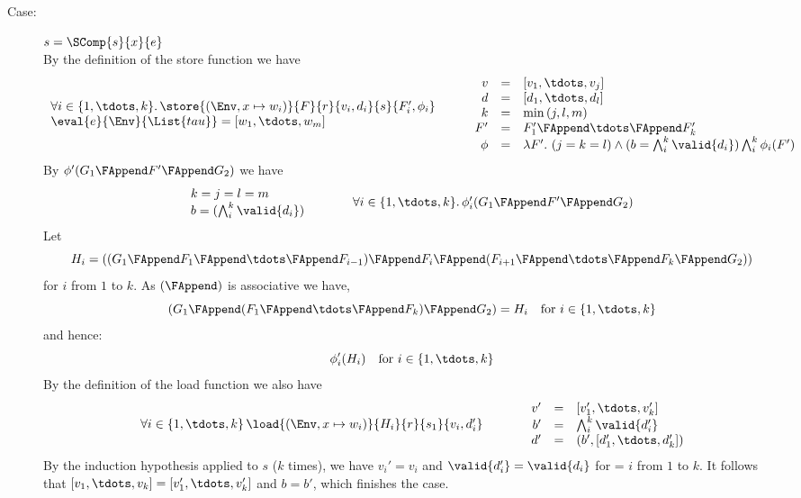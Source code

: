 {\begin{description}
\item[Case:] $s = \SComp{s}{x}{e}$\\[1ex]
By the definition of the store function we have
\[
\begin{array}{l}
\forall i \in \{1,\tdots,k\}.\,\store{(\Env, x \mapsto w_i)}{F}{r}{v_i,d_i}{s}{F_i',\phi_i}\\
\eval{e}{\Env}{\List{tau}} = [w_1,\tdots,w_m ]\\
\end{array}\hspace*{.75cm}\begin{array}{rcl}
v &=& [v_1,\tdots,v_j]\\
d &=& [d_1,\tdots,d_l]\\
k &=& \min{(j,l,m)}\\
F' &=& F_1' \FAppend \tdots \FAppend F_k'\\
\phi &=& \lambda F'.~(j = k = l) \wedge (b = \bigwedge_i^k \valid{d_i}) \bigwedge_i^k \phi_i(F')\\
\end{array}
\]
By $\phi'(G_1 \FAppend F' \FAppend G_2)$ we have
\[
\begin{array}{l}
k = j = l = m\\
b = (\bigwedge_i^k \valid{d_i})\\
\end{array}\hspace*{1cm}\begin{array}{l}
\forall i \in \{1,\tdots,k\}.\,\phi_i'(G_1 \FAppend F' \FAppend G_2) \\
\end{array}
\]
%
Let
\[
H_i = ((G_1\FAppend F_1\FAppend \tdots \FAppend F_{i-1}) \FAppend F_i \FAppend (F_{i+1} \FAppend \tdots \FAppend F_k \FAppend G_2))
\]
for $i$ from $1$ to $k$. As $(\FAppend)$ is associative we have,
\[
(G_1\FAppend (F_1\FAppend \tdots \FAppend F_k)\FAppend G_2) = H_i \quad \text{for}~i \in \{1,\tdots,k\}
\]
and hence:
\[
\phi_i'(H_i) \quad \text{for}~i \in \{1,\tdots,k\}
\]
%
By the definition of the load function we also have 
\[ 
\begin{array}{l}
\forall i \in \{1,\tdots,k\}\,\load{(\Env, x \mapsto w_i)}{H_i}{r}{s_1}{v_i,d_i'}\\
\end{array}\hspace*{1cm}\begin{array}{rcl}
v' &=& [v_1',\tdots,v_k']\\
b' &=& \bigwedge_i^k \valid{d_i'}\\
d' &=& (b',[d_1',\tdots,d_k'])\\
\end{array}
\]
%
By the induction hypothesis applied to $s$ ($k$ times), we have $v_i'
= v_i$ and $\valid{d_i'} = \valid{d_i}$ for = $i$ from $1$ to
$k$. It follows that $[v_1,\tdots,v_k] = [v_1',\tdots,v_k']$ and $b =
b'$, which finishes the case.


\end{description}}
